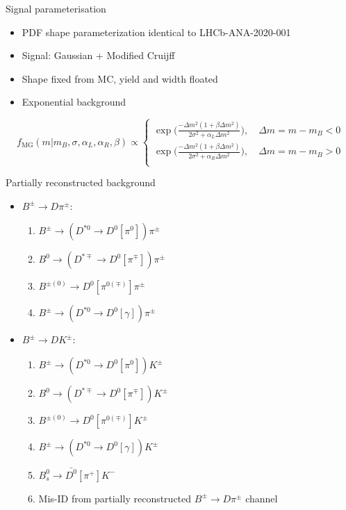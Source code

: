 \documentclass{beamer}
\begin{document}
\begin{frame}{Signal parameterisation}
  \begin{itemize}
    \setlength\itemsep{1.2em}
    \item{PDF shape parameterization identical to LHCb-ANA-2020-001}
    \item{Signal: Gaussian + Modified Cruijff}
    \item{Shape fixed from MC, yield and width floated}
    \item{Exponential background}
  \end{itemize}
  \vspace{0.5cm}
  \begin{equation*}
    f_\text{MG}(m|m_B, \sigma, \alpha_L, \alpha_R, \beta)\propto
    \begin{cases}
      \exp\Big(\frac{-\Delta m^2(1 + \beta\Delta m^2)}{2\sigma^2 + \alpha_L\Delta m^2}\Big), \quad \Delta m = m - m_B < 0 \\
      \exp\Big(\frac{-\Delta m^2(1 + \beta\Delta m^2)}{2\sigma^2 + \alpha_R\Delta m^2}\Big), \quad \Delta m = m - m_B > 0 \\
    \end{cases}
  \end{equation*}
\end{frame}

\begin{frame}{Partially reconstructed background}
  \begin{itemize}
    \setlength\itemsep{1.3em}
    \item{$B^\pm\to D\pi^\pm$:}
    \begin{enumerate}
    \setlength\itemsep{0.4em}
      \item{$B^\pm\to (D^{*0}\to D^0[\pi^0])\pi^\pm$}
      \item{$B^0\to (D^{*\mp}\to D^0[\pi^\mp])\pi^\pm$}
      \item{$B^{\pm(0)}\to D^0[\pi^{0(\mp)}]\pi^\pm$}
      \item{$B^\pm\to(D^{*0}\to D^0[\gamma])\pi^\pm$}
    \end{enumerate}
    \item{$B^\pm\to DK^\pm$:}
    \begin{enumerate}
      \setlength\itemsep{0.4em}
      \item{$B^\pm\to (D^{*0}\to D^0[\pi^0])K^\pm$}
      \item{$B^0\to (D^{*\mp}\to D^0[\pi^\mp])K^\pm$}
      \item{$B^{\pm(0)}\to D^0[\pi^{0(\mp)}]K^\pm$}
      \item{$B^\pm\to(D^{*0}\to D^0[\gamma])K^\pm$}
      \item{$B_s^0\to\bar{D^0}[\pi^+]K^-$}
      \item{Mis-ID from partially reconstructed $B^\pm\to D\pi^\pm$ channel}
    \end{enumerate}
  \end{itemize}
\end{frame}
\end{document}
